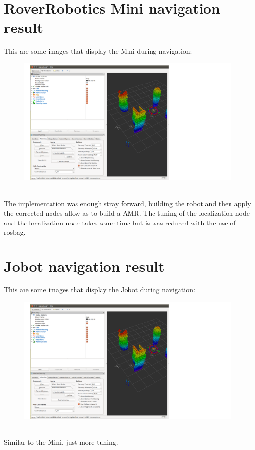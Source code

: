 \section{RoverRobotics Mini navigation result}
This are some images that display the Mini during navigation:\\
\begin{figure}[h]
\centering
\includegraphics[width=0.7\linewidth]{img/rviz.png}
\end{figure}
\\
The implementation was enough stray forward, building the robot and then apply the corrected nodes allow as to build a AMR. The tuning of the localization node and the localization node takes some time but is was reduced with the use of rosbag. 
\section{Jobot navigation result}
This are some images that display the Jobot during navigation:\\
\begin{figure}[h]
\centering
\includegraphics[width=0.7\linewidth]{img/rviz.png}
\end{figure}
\\
Similar to the Mini, just more tuning.
